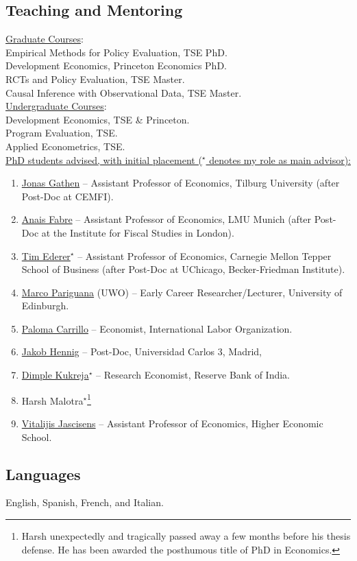 \documentclass[12pt,english]{article}
\newcommand\reverselabel[1]{%
  \def\theenumi{}%
  \renewcommand\makelabel{\makebox[\dimexpr\labelwidth-3pt\relax][r]{%
    \the\numexpr#1-\value{enumi}+1\relax}}}%
\begin{document}
\subsection*{Teaching and Mentoring}
\underline{Graduate Courses}: \\
Empirical Methods for Policy Evaluation, TSE PhD.\vspace{0.2cm} \\
Development Economics, Princeton Economics PhD.\vspace{0.2cm} \\
RCTs and Policy Evaluation, TSE Master. \vspace{0.2cm} \\
Causal Inference with Observational Data, TSE Master. \\

\noindent \underline{Undergraduate Courses}: \\
Development Economics, TSE \& Princeton. \vspace{0.2cm}\\
Program Evaluation, TSE. \vspace{0.2cm}\\
Applied Econometrics, TSE. \\

\noindent \underline{PhD students advised, with initial placement ($^\star$ denotes my role as main advisor):} 
\begin{enumerate}\reverselabel{9}
\item \href{https://www.jonasgathen.com/}{Jonas Gathen} -- Assistant Professor of Economics, Tilburg University (after Post-Doc at CEMFI).
\item \href{https://www.anaisfabre.com/home}{Anais Fabre} -- Assistant Professor of Economics, LMU Munich (after Post-Doc at the Institute for Fiscal Studies in London).
\item \href{https://sites.google.com/view/tim-ederer}{Tim Ederer}$^\star$ -- Assistant Professor of Economics, Carnegie Mellon Tepper School of Business (after Post-Doc at UChicago, Becker-Friedman Institute).
\item \href{https://www.marcopariguana.com/}{Marco Pariguana} (UWO) -- Early Career Researcher/Lecturer, University of Edinburgh.
\item \href{https://sites.google.com/view/palomacarrillo}{Paloma Carrillo} -- Economist, International Labor Organization.
\item \href{https://sites.google.com/view/jakob-hennig/home}{Jakob Hennig} -- Post-Doc, Universidad Carlos 3, Madrid,
\item\href{https://sites.google.com/view/dimplekukreja/home}{Dimple Kukreja}$^\star$ --  Research Economist, Reserve Bank of India.
\item Harsh Malotra$^\star$\footnote{Harsh unexpectedly and tragically passed away a few months before his thesis defense. He has been awarded the posthumous title of PhD in Economics.} 
\item \href{https://www.hse.ru/en/org/persons/224668008}{Vitalijis Jascisens} -- Assistant Professor of Economics, Higher Economic School.
\end{enumerate}

\subsection*{Languages}
English, Spanish, French, and Italian.
\end{document}
